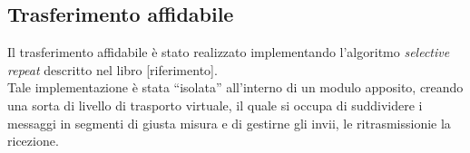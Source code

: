 \subsection{Trasferimento affidabile}
Il trasferimento affidabile è stato realizzato implementando l'algoritmo \emph{selective repeat} descritto nel libro [riferimento].\\
Tale implementazione è stata ``isolata'' all'interno di un modulo apposito, creando una sorta di livello di trasporto virtuale, il quale si occupa di suddividere i messaggi in segmenti di giusta misura e di gestirne gli invii, le ritrasmissionie la ricezione.



